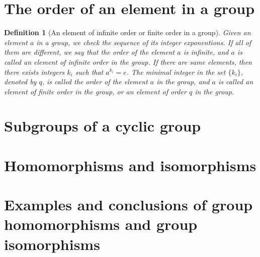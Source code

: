 \documentclass[onecolumn]{ctexart}
\newtheorem{definition}{Definition}
\begin{document}
\section{The order of an element in a group}

\begin{definition}[An element of infinite order or finite order in a group]
  Given an element $a$ in a group, we check the sequence of its integer 
  exponentions. If all of them are different, we say that the order of the 
  element $a$ is infinite, and $a$ is called an element of infinite order in the 
  group. If there are same elements, then there exists integers $k_i$ such that 
  $a^{k_i} = e$. The minimal integer in the set $\lbrace k_i \rbrace$, denoted 
  by $q$, is called the order of the element $a$ in the group, and $a$ is called 
  an element of finite order in the group, or an element of order $q$ in the 
  group.
\end{definition}

\section{Subgroups of a cyclic group}

\section{Homomorphisms and isomorphisms}

\section{Examples and conclusions of group homomorphisms and group isomorphisms}
\end{document}
